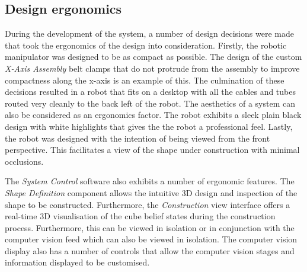 
\subsection{Design ergonomics}


During the development of the system, a number of design decisions were made that took the ergonomics of the design into consideration. Firstly, the robotic manipulator was designed to be as compact as possible. The design of the custom \textit{X-Axis Assembly} belt clamps that do not protrude from the assembly to improve compactness along the x-axis is an example of this. The culmination of these decisions resulted in a robot that fits on a desktop with all the cables and tubes routed very cleanly to the back left of the robot. The aesthetics of a system can also be considered as an ergonomics factor. The robot exhibits a sleek plain black design with white highlights that gives the the robot a professional feel. Lastly, the robot was designed with the intention of being viewed from the front perspective. This facilitates a view of the shape under construction with minimal occlusions.

The \textit{System Control} software also exhibits a number of ergonomic features. The \textit{Shape Definition} component allows the intuitive 3D design and inspection of the shape to be constructed. Furthermore, the \textit{Construction} view interface offers a real-time 3D visualisation of the cube belief states during the construction process. Furthermore, this can be viewed in isolation or in conjunction with the computer vision feed which can also be viewed in isolation. The computer vision display also has a number of controls that allow the computer vision stages and information displayed to be customised.

